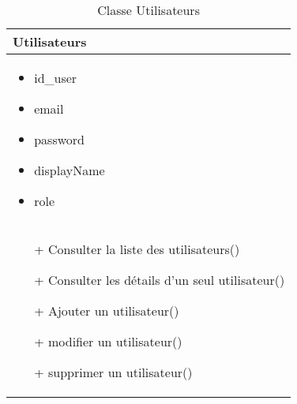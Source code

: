 \begin{table}[H]
    \begin{center}
        \begin{tabular}{|Z{5cm}|}
            \hline
            \textbf{Utilisateurs}\\
            \hline
            \begin{itemize}
                \item id\_user
                \item email
                \item password
                \item displayName
                \item role
            \end{itemize}\\
            \hline
            \begin{itemize}
                \item[+] Consulter la liste des utilisateurs()
                \item[+] Consulter les détails d'un seul utilisateur() 
                \item[+] Ajouter un utilisateur()
                \item[+] modifier un utilisateur()
                \item[+] supprimer un utilisateur()
            \end{itemize}
            \\
            \hline
        \end{tabular}	
        \caption{Classe Utilisateurs}
    \end{center}
\end{table}

